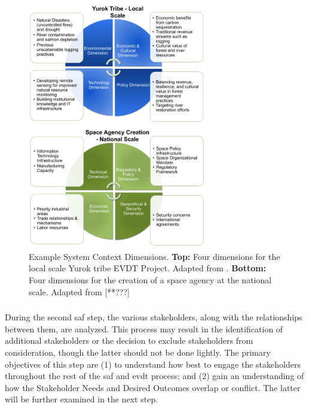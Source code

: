 \begin{figure}[!htb] 
\centering
\includegraphics[width=0.7\textwidth]{Figures/chap3/dimensions_examples.png}
\caption[Example System Context Dimensions]{Example System Context Dimensions. \textbf{Top:} Four dimensions for the local scale Yurok tribe EVDT Project. Adapted from \cite{lombardoDevelopmentDecisionSupport2021}. \textbf{Bottom:} Four dimensions for the creation of a space agency at the national scale. Adapted from [**???]}
\label{fig:dimensions_example}
\end{figure} 


\subsubsection{} \label{sec:saf_stakeholders}

During the second \ac{saf} step, the various stakeholders, along with the relationships between them, are analyzed. This process may result in the identification of additional stakeholders or the decision to exclude stakeholders from consideration, though the latter should not be done lightly. The primary objectives of this step are (1) to understand how best to engage the stakeholders throughout the rest of the \ac{saf} and \ac{evdt} process; and (2) gain an understanding of how the Stakeholder Needs and Desired Outcomes overlap or conflict. The latter will be further examined in the next step.

